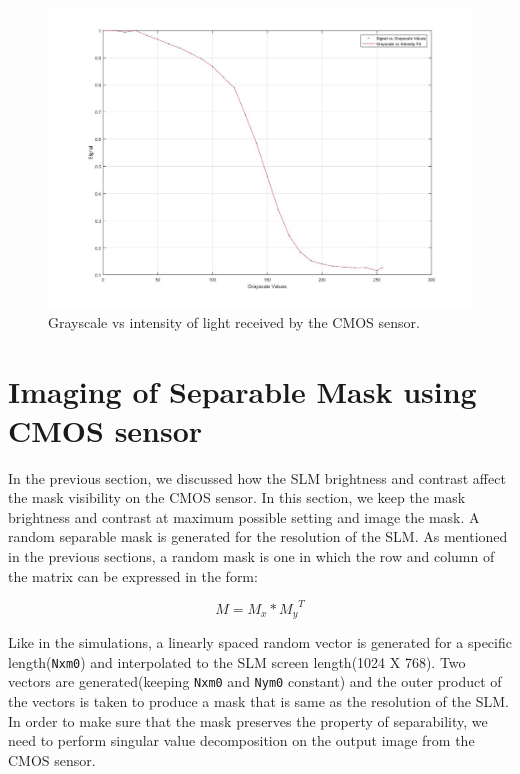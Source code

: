 \begin{figure}[!htbp]
\centering
\includegraphics[width = \linewidth]{pics/slm/grayscale_slm_graph.jpg}
\caption{Grayscale vs intensity of light received by the CMOS sensor.}
\label{fig:grayscale_slm_graph}
\end{figure}

\section{Imaging of Separable Mask using CMOS sensor}
In the previous section, we discussed how the SLM brightness and contrast affect the mask visibility on the CMOS sensor. In this section, we keep the mask brightness and contrast at maximum possible setting and image the mask. A random separable mask is generated for the resolution of the SLM. As mentioned in the previous sections, a random mask is one in which the row and column of the matrix can be expressed in the form:

$$
M = M_{x} * {M_{y}}^T
$$

Like in the simulations, a linearly spaced random vector is generated for a specific length(\texttt{Nxm0}) and interpolated to the SLM screen length(1024 X 768). Two vectors are generated(keeping \texttt{Nxm0} and \texttt{Nym0} constant) and the outer product of the vectors is taken to produce a mask that is same as the resolution of the SLM.
In order to make sure that the mask preserves the property of separability, we need to perform singular value decomposition on the output image from the CMOS sensor.

